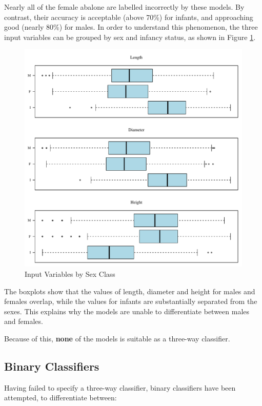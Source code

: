 \documentclass[11pt, a4paper]{article}
\begin{document}
    Nearly all of the female abalone are labelled incorrectly by these models. By contrast, their accuracy is acceptable (above 70\%) for infants, and approaching good (nearly 80\%) for males. In order to understand this phenomenon, the three input variables can be grouped by sex and infancy status, as shown in Figure \ref{boxplots}.

    \begin{figure}[hbt!]
        \centering
        \includegraphics[width=\textwidth]{2.4.pdf}
        \caption{Input Variables by Sex Class}
        \label{boxplots}
    \end{figure}

    The boxplots show that the values of length, diameter and height for males and females overlap, while the values for infants are substantially separated from the sexes. This explains why the models are unable to differentiate between males and females.

    Because of this, \textbf{none} of the models is suitable as a three-way classifier.

    \subsection{Binary Classifiers}

    Having failed to specify a three-way classifier, binary classifiers have been attempted, to differentiate between:
\end{document}
